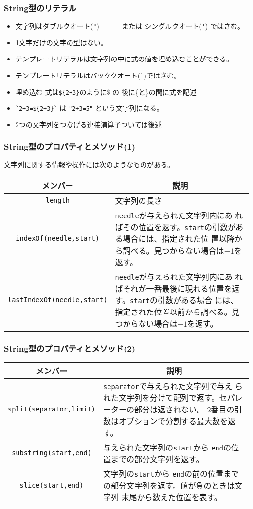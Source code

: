 \begin{frame}[containsverbatim]
 \frametitle{String型のリテラル}
 \begin{itemize}
  \item 文字列はダブルクオート(\Verb+"+) 
　　　または シングルクオート(\Verb+'+) ではさむ。%
  \item 1文字だけの文字の型はない。
  \item テンプレートリテラルは文字列の中に式の値を埋め込むことができる。
  \item テンプレートリテラルはバッククオート(\Verb+`+)ではさむ。
  \item 埋め込む 式は\texttt{\$\{2+3\}}のように\$ の
        後に\{と\}の間に式を記述
  \item \Verb-`2+3=${2+3}`- は \Verb-"2+3=5"- という文字列になる。
  \item 2つの文字列をつなげる連接演算子\ElmJ{+}ついては後述
 \end{itemize}
\end{frame}
\begin{frame}[containsverbatim]
 \frametitle{String型のプロパティとメソッド(1)}
文字列に関する情報や操作には次のようなものがある。
\begin{center}
  \begin{tabular}{|c|m{}|}\hline
 メンバー&\multicolumn{1}{c|}{説明} \\\hline
  \Verb+length+ &文字列の長さ\\ \hline
\Verb+indexOf(needle,start)+& \Verb+needle+が与えられた文字列内にあ
      ればその位置を返す。\Verb+start+の引数がある場合には、指定された位
      置以降から調べる。見つからない場合は$-1$を返す。\\\hline
\Verb+lastIndexOf(needle,start)+& \Verb+needle+が与えられた文字列内にあ
      ればそれが一番最後に現れる位置を返す。\Verb+start+の引数がある場合
      には、指定された位置以前から調べる。見つからない場合は$-1$を返す。\\\hline
  \end{tabular}
\end{center}
\end{frame}
\begin{frame}[containsverbatim]
 \frametitle{String型のプロパティとメソッド(2)}
\begin{center}
 \begin{tabular}{|c|m{}|}\hline
 メンバー&\multicolumn{1}{c|}{説明} \\\hline
  \Verb+split(separator,limit)+&\Verb+separator+で与えられた文字列で与え
      られた文字列を分けて配列で返す。セパレーターの部分は返されない。
      2番目の引数はオプションで分割する最大数を返す。\\ \hline
  \Verb+substring(start,end)+&与えられた文字列の\Verb+start+から
      \Verb+end+の位置までの部分文字列を返す。\\ \hline
  \Verb+slice(start,end)+&文字列の\Verb+start+から
      \Verb+end+の前の位置までの部分文字列を返す。値が負のときは文字列
      末尾から数えた位置を表す。\\ \hline
\end{tabular}
\end{center}
\end{frame}
